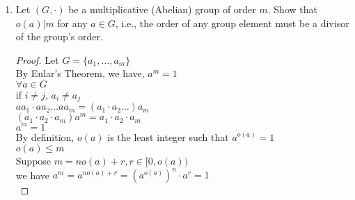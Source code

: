 \documentclass{article}
\theoremstyle{break}
\begin{document}
\begin{enumerate}
\begin{proof}
\begin{enumerate}
                        \item 
                        \textbf{Associative}: \\
                        $x*(y*z)=x*(yz-y-z+2)=xyz-xy-xz+2x-x-yz+y+z-2+2=xyz-xy-xz+x-yz+y+z$\\
                        $(x*y)*z=(xy-x-y+2)*z=xyz-xz-yz+2z-xy+x+y-2-z+2=xyz-xz-yz+z-xy+x+y$
                        \item 
                        \textbf{Identity}:\\
                        $\exists 2 \in G, \forall  x \in G$, we have $2 * x = 2x - 2-x +2 = x =x * 2$
                        \item
                        \textbf{inverse}:\\
                        $\forall x \in G$, $\exists x^{-1} = \frac{x}{x-1}$, such that $x * x^{-1} = x \frac{x}{x-1} - x - \frac{x}{x-1} + 2 = 2$
                        \item 
                        \textbf{Commutative}:\\
                        $x*y = xy - x -y +2 = yx - y- x +2 = y*x$
                \end{enumerate}
        \end{proof}
        \item 
        Let $(G,·)$ be a multiplicative (Abelian) group of order $m$.  Show that $o(a)|m$ for any $a \in G$, i.e., the order of any group element must be a divisor of the group's order.
        \begin{proof}
                Let $G = \{  a_1, \dots , a_m \}$ \\
                By Eular's Theorem, we have, $a^m=1$\\
                $\forall a \in G$\\
                if $i \neq j$, $a_i \neq a_j$\\
                $aa_1\cdot aa_2 \dots aa_m = (a_1 \cdot a_2 \dots )a_m$\\
                $(a_1 \cdot a_2 \cdot a_m)a^m = a_1 \cdot a_2 \cdot a_m$\\
                $a^m = 1$\\
                By definition, $o(a)$ is the least integer such that $a^{o(a)} = 1$\\
                $o(a) \leq m$\\
                Suppose $m = no(a) + r, r \in [0, o(a) )$\\
                we have $a^m = a^{n o(a) + r} = (a^{o(a)})^n \cdot a^r = 1$\\

\end{proof}
\end{enumerate}
\end{document}
